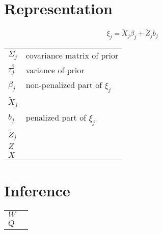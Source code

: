 \documentclass{article}
\begin{document}
\begin{multicols}{2}
\section*{Representation}

$$\xi_j = \tilde{X}_j \beta_j + \tilde{Z}_j b_j$$

\begin{tabular}{l l}
$\Sigma_j$ & covariance matrix of prior \\
$\tau_j^2$ & variance of prior \\
$\beta_j$ & non-penalized part of $\xi_j$ \\
$\tilde{X}_j$ &  \\
$b_j$ & penalized part of $\xi_j$ \\
$\tilde{Z}_j$ &  \\
$Z$ &  \\
$X$ &  \\
\end{tabular}

\section*{Inference}

\begin{tabular}{l l}
$W$ &  \\
$Q$ &  \\
\end{tabular}

\end{multicols}
\end{document}
